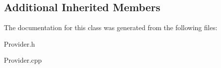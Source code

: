 \subsection*{Additional Inherited Members}


The documentation for this class was generated from the following files\+:\begin{DoxyCompactItemize}
\item 
Provider.\+h\item 
Provider.\+cpp\end{DoxyCompactItemize}
